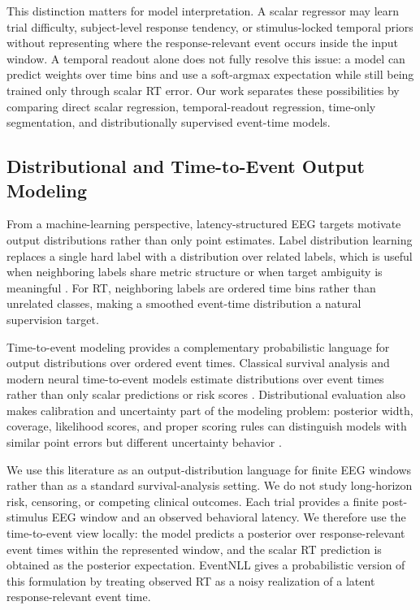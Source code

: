 \documentclass[12pt]{article}
\begin{document}
This distinction matters for model interpretation. A scalar regressor may learn trial difficulty, subject-level response tendency, or stimulus-locked temporal priors without representing where the response-relevant event occurs inside the input window. A temporal readout alone does not fully resolve this issue: a model can predict weights over time bins and use a soft-argmax expectation while still being trained only through scalar RT error. Our work separates these possibilities by comparing direct scalar regression, temporal-readout regression, time-only segmentation, and distributionally supervised event-time models.

\subsection{Distributional and Time-to-Event Output Modeling}
From a machine-learning perspective, latency-structured EEG targets motivate output distributions rather than only point estimates. Label distribution learning replaces a single hard label with a distribution over related labels, which is useful when neighboring labels share metric structure or when target ambiguity is meaningful \citep{Geng2016LabelDistributionLearning}. For RT, neighboring labels are ordered time bins rather than unrelated classes, making a smoothed event-time distribution a natural supervision target.

Time-to-event modeling provides a complementary probabilistic language for output distributions over ordered event times. Classical survival analysis and modern neural time-to-event models estimate distributions over event times rather than only scalar predictions or risk scores \citep{Cox1972CoxPH,Lee2018DeepHit}. Distributional evaluation also makes calibration and uncertainty part of the modeling problem: posterior width, coverage, likelihood scores, and proper scoring rules can distinguish models with similar point errors but different uncertainty behavior \citep{Chapfuwa2023Calibration,Haider2020SurvivalDistributions}.

We use this literature as an output-distribution language for finite EEG windows rather than as a standard survival-analysis setting. We do not study long-horizon risk, censoring, or competing clinical outcomes. Each trial provides a finite post-stimulus EEG window and an observed behavioral latency. We therefore use the time-to-event view locally: the model predicts a posterior over response-relevant event times within the represented window, and the scalar RT prediction is obtained as the posterior expectation. EventNLL gives a probabilistic version of this formulation by treating observed RT as a noisy realization of a latent response-relevant event time.
\end{document}
